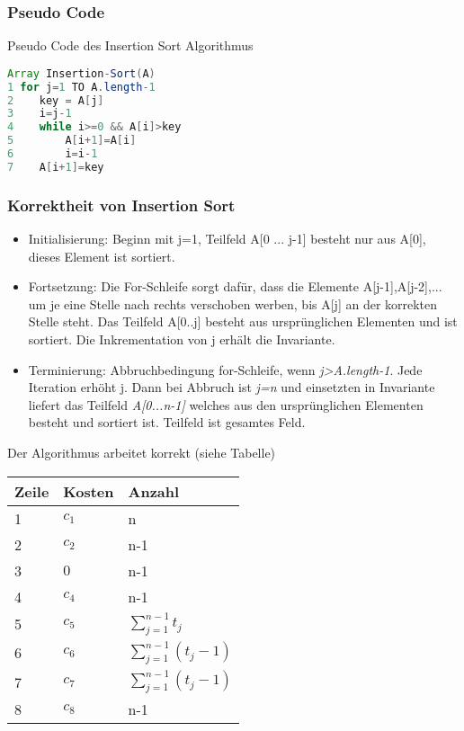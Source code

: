 \documentclass[jou,apacite]{apa6}
\begin{document}
\subsubsection{Pseudo Code}
Pseudo Code des Insertion Sort Algorithmus
{\ttfamily
\begin{lstlisting}[language=Java]
Array Insertion-Sort(A)
1 for j=1 TO A.length-1
2    key = A[j]
3    i=j-1
4    while i>=0 && A[i]>key
5        A[i+1]=A[i]
6        i=i-1
7    A[i+1]=key
\end{lstlisting}}


\subsubsection{Korrektheit von Insertion Sort}
\begin{itemize}
    \item Initialisierung: Beginn mit j=1, Teilfeld A[0 ... j-1] besteht nur aus A[0], dieses Element ist sortiert.
    \item Fortsetzung: Die For-Schleife sorgt dafür, dass die Elemente A[j-1],A[j-2],... um je eine Stelle nach rechts verschoben werben, bis A[j] an der korrekten Stelle steht. Das Teilfeld A[0..j] besteht aus ursprünglichen Elementen und ist sortiert. Die Inkrementation von j erhält die Invariante.
    \item Terminierung: Abbruchbedingung for-Schleife, wenn {\itshape j>A.length-1}. Jede Iteration erhöht j. Dann bei Abbruch ist {\itshape j=n} und einsetzten in Invariante liefert das Teilfeld {\itshape A[0...n-1]} welches aus den ursprünglichen Elementen besteht und sortiert ist. Teilfeld ist gesamtes Feld.
\end{itemize}

Der Algorithmus arbeitet korrekt (siehe Tabelle)
\begin{table}[h]
\centering
\begin{tabular}{|l|l|l|}
\hline
Zeile & Kosten & Anzahl  \\
\hline
1     & $c_1$     &  n       \\
2     & $c_2$     &  n-1        \\
3     & $0$       &  n-1        \\
4     & $c_4$     &  n-1        \\
5     & $c_5$     &  $\sum\limits_{j=1}^{n-1}t_j$       \\
6     & $c_6$     &  $\sum\limits_{j=1}^{n-1}(t_j-1)$        \\
7     & $c_7$     &  $\sum\limits_{j=1}^{n-1}(t_j-1)$        \\
8     & $c_8$     &  n-1    \\
\hline
\end{tabular}
\end{table}
\end{document}
